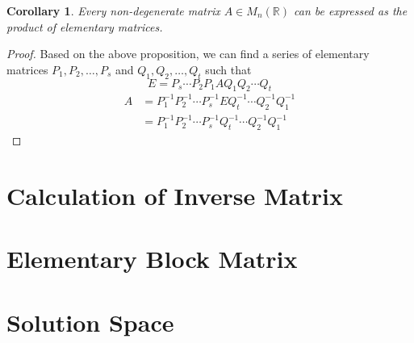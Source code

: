 \documentclass[onecolumn]{ctexart}
\newtheorem{corollary}{Corollary}
\begin{document}
\begin{corollary}
  Every non-degenerate matrix $A \in M_n(\mathbb{R})$ can be expressed as the 
  product of elementary matrices.
\end{corollary}
\begin{proof}
  Based on the above proposition, we can find a series of elementary matrices 
  $P_1, P_2, \ldots, P_s$ and $Q_1, Q_2, \ldots, Q_t$ such that
  \[
    E = P_s\cdots P_2P_1 A Q_1Q_2 \cdots Q_t
  \]
  \[
    \begin{split}
      A &= P_1^{-1}P_2^{-1} \cdots P_s^{-1} E Q_t^{-1} \cdots Q_2^{-1} Q_1^{-1} \\
        &= P_1^{-1}P_2^{-1} \cdots P_s^{-1} Q_t^{-1} \cdots Q_2^{-1} Q_1^{-1}
    \end{split}
  \]
\end{proof}

\section{Calculation of Inverse Matrix}

\section{Elementary Block Matrix}

\section{Solution Space}
\end{document}
